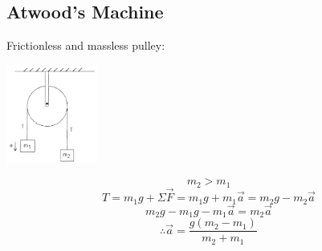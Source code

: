 \documentclass{article}
\begin{document}
  	\subsection{Atwood's Machine}
  		Frictionless and massless pulley:
  
  		\begin{multicols}{2}
  			\centerline{\includegraphics[width=3cm]{atwood.png}}
  		\columnbreak
        	\[
            	m_2>m_1
            \]
  			\[
            	T=m_1g+\Sigma\vec{F}=m_1g+m_1\vec{a}=m_2g-m_2\vec{a}
            \]
  			\[
            	m_2g-m_1g-m_1\vec{a}=m_2\vec{a}
            \]
  			\[
            	\therefore\vec{a}=\frac{g(m_2-m_1)}{m_2+m_1}
            \]
  		\end{multicols}
  
\end{document}
